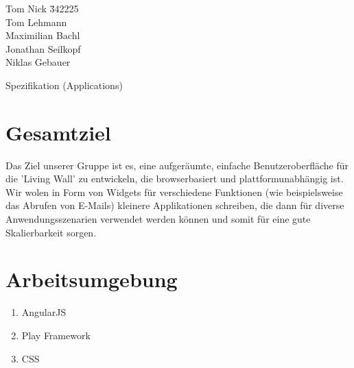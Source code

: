 \documentclass[10pt,a4paper]{article}
\begin{document}
\begin{tabbing}
Tom Nick \hspace{1.4cm}\= 342225\\
Tom Lehmann\\
Maximilian Bachl\\
Jonathan Seilkopf\\
Niklas Gebauer 
\end{tabbing}
\begin{center}
\begin{Huge}
Spezifikation (Applications)
\end{Huge}
\end{center}
\section{Gesamtziel}
Das Ziel unserer Gruppe ist es, eine aufgeräumte, einfache Benutzeroberfläche für die 'Living Wall' zu entwickeln, die browserbasiert und  plattformunabhängig ist. Wir wolen in Form von Widgets für verschiedene Funktionen (wie beispielsweise das Abrufen von E-Mails) kleinere Applikationen schreiben, die dann für diverse Anwendungsszenarien verwendet werden können und somit für eine gute Skalierbarkeit sorgen.

\section{Arbeitsumgebung}
\begin{enumerate}
\item AngularJS
\item Play Framework
\item CSS
\end{enumerate}
\end{document}

